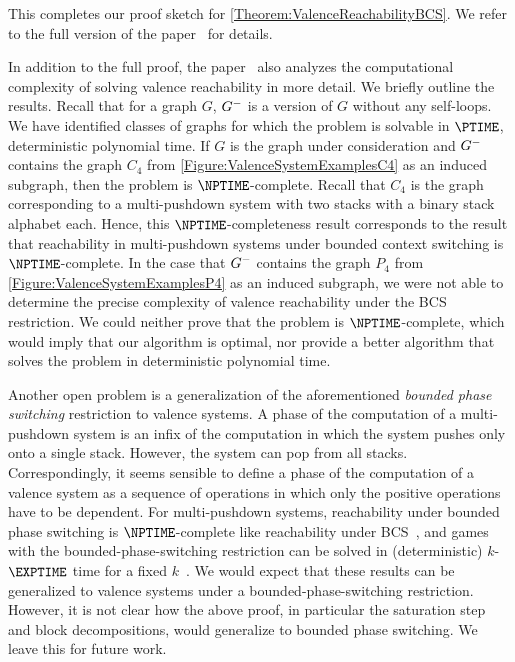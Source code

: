 \documentclass[../../diss.tex]{subfiles}
\begin{document}
This completes our proof sketch for \cref{Theorem:ValenceReachabilityBCS}.
We refer to the full version of the paper~\cite{MeyerMZ18a} for details.

In addition to the full proof, the paper~\cite{MeyerMZ18,MeyerMZ18a} also analyzes the computational complexity of solving valence reachability in more detail.
We briefly outline the results.
Recall that for a graph $G$, ${G}^{-}$ is a version of $G$ without any self-loops.
We have identified classes of graphs for which the problem is solvable in $\PTIME$, \ie deterministic polynomial time.
If $G$ is the graph under consideration and ${G}^{-}$ contains the graph $C_4$ from \cref{Figure:ValenceSystemExamplesC4} as an induced subgraph, then the problem is $\NPTIME$-complete.
Recall that $C_4$ is the graph corresponding to a multi-pushdown system with two stacks with a binary stack alphabet each.
Hence, this $\NPTIME$-completeness result corresponds to the result that reachability in multi-pushdown systems under bounded context switching is $\NPTIME$-complete.
In the case that ${G}^{-}$ contains the graph $P_4$ from \cref{Figure:ValenceSystemExamplesP4} as an induced subgraph, we were not able to determine the precise complexity of valence reachability under the BCS restriction.
We could neither prove that the problem is $\NPTIME$-complete, which would imply that our algorithm is optimal, nor provide a better algorithm that solves the problem in deterministic polynomial time.

Another open problem is a generalization of the aforementioned \emph{bounded phase switching} restriction to valence systems.
A phase of the computation of a multi-pushdown system is an infix of the computation in which the system pushes only onto a single stack.
However, the system can pop from all stacks.
Correspondingly, it seems sensible to define a phase of the computation of a valence system as a sequence of operations in which only the positive operations have to be dependent.
For multi-pushdown systems, reachability under bounded phase switching is $\NPTIME$-complete like reachability under BCS~\cite{TorreMP07}, and games with the bounded-phase-switching restriction can be solved in (deterministic) $k$-$\EXPTIME$ time for a fixed $k$~\cite{Seth09}.
We would expect that these results can be generalized to valence systems under a bounded-phase-switching restriction.
However, it is not clear how the above proof, in particular the saturation step and block decompositions, would generalize to bounded phase switching.
We leave this for future work.
\end{document}
